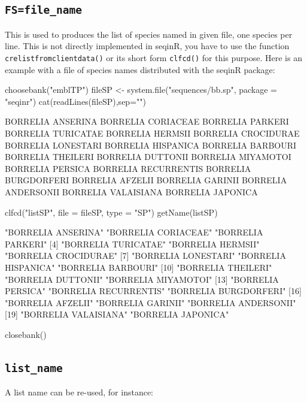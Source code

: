 \documentclass{article}
\begin{document}
\subsection{\texttt{FS=file\_name}}

This is used to produces the list of species named in given file, one species per line.
This is not directly implemented in seqinR, you have to use the function
\texttt{crelistfromclientdata()} or its short form \texttt{clfcd()} for this purpose. Here is an example with
a file of species names distributed with the seqinR package:

\begin{Schunk}
\begin{Sinput}
 choosebank("emblTP")
 fileSP <- system.file("sequences/bb.sp", package = "seqinr")
 cat(readLines(fileSP),sep="\n")
\end{Sinput}
\begin{Soutput}
BORRELIA ANSERINA
BORRELIA CORIACEAE
BORRELIA PARKERI
BORRELIA TURICATAE
BORRELIA HERMSII
BORRELIA CROCIDURAE
BORRELIA LONESTARI
BORRELIA HISPANICA
BORRELIA BARBOURI
BORRELIA THEILERI
BORRELIA DUTTONII
BORRELIA MIYAMOTOI
BORRELIA PERSICA
BORRELIA RECURRENTIS
BORRELIA BURGDORFERI
BORRELIA AFZELII
BORRELIA GARINII
BORRELIA ANDERSONII
BORRELIA VALAISIANA
BORRELIA JAPONICA
\end{Soutput}
\begin{Sinput}
 clfcd("listSP", file = fileSP, type = "SP")
 getName(listSP) 
\end{Sinput}
\begin{Soutput}
 [1] "BORRELIA ANSERINA"    "BORRELIA CORIACEAE"   "BORRELIA PARKERI"    
 [4] "BORRELIA TURICATAE"   "BORRELIA HERMSII"     "BORRELIA CROCIDURAE" 
 [7] "BORRELIA LONESTARI"   "BORRELIA HISPANICA"   "BORRELIA BARBOURI"   
[10] "BORRELIA THEILERI"    "BORRELIA DUTTONII"    "BORRELIA MIYAMOTOI"  
[13] "BORRELIA PERSICA"     "BORRELIA RECURRENTIS" "BORRELIA BURGDORFERI"
[16] "BORRELIA AFZELII"     "BORRELIA GARINII"     "BORRELIA ANDERSONII" 
[19] "BORRELIA VALAISIANA"  "BORRELIA JAPONICA"   
\end{Soutput}
\begin{Sinput}
 closebank()
\end{Sinput}
\end{Schunk}

\subsection{\texttt{list\_name}}

A list name can be re-used, for instance:
\end{document}

